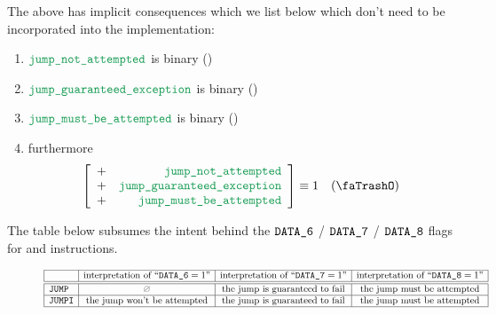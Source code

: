 \saNote{} The above has implicit consequences which we list below which don't need to be incorporated into the implementation:
\begin{enumerate}
	\item $\locJumpNotAttempted        $ is binary \quad (\trash)
	\item $\locJumpGuaranteedException $ is binary \quad (\trash)
	\item $\locJumpMustBeAttempted     $ is binary \quad (\trash)
	\item furthermore
		\[
			\left[ \begin{array}{cr}
				+ & \locJumpNotAttempted        \\
				+ & \locJumpGuaranteedException \\
				+ & \locJumpMustBeAttempted     \\
			\end{array} \right]
			\equiv 1
			\quad (\trash)
		\]
\end{enumerate}
The table below subsumes the intent behind the $\texttt{DATA\_6}$  / $\texttt{DATA\_7}$ / $\texttt{DATA\_8}$ flags for  and  instructions.
\begin{figure}[!h]
	\renewcommand{\arraystretch}{1.3}
	\[
		\begin{array}{|l|c|c|c|} \hline
                                     & \text{interpretation of } ``\oobDataCol{6} = 1" & \text{interpretation of } ``\oobDataCol{7} = 1" & \text{interpretation of } ``\oobDataCol{8} = 1" \\ \hline \hline
			\inst{JUMP}  & \nothing                                        & \text{the jump is guaranteed to fail}           & \text{the jump must be attempted}               \\ \hline
			\inst{JUMPI} & \text{the jump won't be attempted}              & \text{the jump is guaranteed to fail}           & \text{the jump must be attempted}               \\ \hline
		\end{array}
	\]
	\label{fig: oob: jump case interpretation of oob events}
\end{figure}
